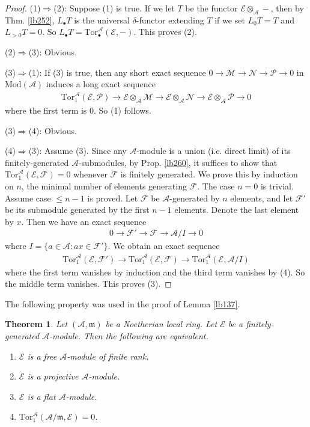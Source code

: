 \documentclass[12pt,b5paper,notitlepage]{report}
\theoremstyle{definition}
\theoremstyle{plain}
\newtheorem{thm}[df]{Theorem}
\newcommand{\mc}{\mathcal}
\newcommand{\blt}{\bullet}
\newcommand{\Tor}{\mathrm{Tor}}
\newcommand{\Mod}{\mathrm{Mod}}
\newcommand{\mk}{\mathfrak m}
\numberwithin{equation}{section}
\begin{document}
\begin{proof}
(1)$\Rightarrow$(2): Suppose (1) is true. If we let $T$ be the functor $\mc E\otimes_{\mc A}-$, then by Thm. \ref{lb252}, $L_\blt T$ is the universal $\delta$-functor extending $T$ if we set $L_0T=T$ and $L_{>0}T=0$. So $L_\blt T=\Tor^{\mc A}_\blt(\mc E,-)$. This proves (2).  

(2)$\Rightarrow$(3): Obvious.

(3)$\Rightarrow$(1): If (3) is true, then any short exact sequence $0\rightarrow\mc M\rightarrow\mc N\rightarrow\mc P\rightarrow0$ in $\Mod(\mc A)$ induces a long exact sequence
\begin{align*}
\Tor_1^{\mc A}(\mc E,\mc P)\rightarrow \mc E\otimes_{\mc A}\mc M\rightarrow\mc E\otimes_{\mc A}\mc N\rightarrow\mc E\otimes_{\mc A}\mc P\rightarrow0
\end{align*}
where the first term is $0$. So (1) follows.

(3)$\Rightarrow$(4): Obvious.

(4)$\Rightarrow$(3): Assume (3). Since any $\mc A$-module is a union (i.e. direct limit) of its finitely-generated $\mc A$-submodules, by Prop. \ref{lb260}, it suffices to show that $\Tor_1^{\mc A}(\mc E,\mc F)=0$ whenever $\mc F$ is finitely generated. We prove this by induction on $n$, the minimal number of elements generating $\mc F$. The case $n=0$ is trivial. Assume case $\leq n-1$ is proved. Let $\mc F$ be $\mc A$-generated by $n$ elements, and let $\mc F'$ be its submodule generated by the first $n-1$ elements. Denote the last element by $x$. Then we have an exact sequence
\begin{align*}
0\rightarrow\mc F'\rightarrow\mc F\rightarrow\mc A/I\rightarrow0
\end{align*}
where $I=\{a\in\mc A:ax\in\mc F'\}$. We obtain an exact sequence
\begin{align*}
\Tor_1^{\mc A}(\mc E,\mc F')\rightarrow \Tor_1^{\mc A}(\mc E,\mc F)\rightarrow\Tor_1^{\mc A}(\mc E,\mc A/I)
\end{align*}
where the first term vanishes by induction and the third term vanishes by (4). So the middle term vanishes. This proves (3).
\end{proof}


The following property was used in the proof of Lemma \ref{lb137}. 

\begin{thm}\label{lb280}
Let $(\mc A,\mk)$ be a Noetherian local ring. Let $\mc E$ be a finitely-generated $\mc A$-module. Then the following are equivalent.
\begin{enumerate}[label=(\arabic*)]
\item $\mc E$ is a free $\mc A$-module of finite rank.
\item $\mc E$ is a projective $\mc A$-module.
\item $\mc E$ is a flat $\mc A$-module.
\item $\Tor_1^{\mc A}(\mc A/\mk,\mc E)=0$.
\end{enumerate}
\end{thm}
\end{document}
